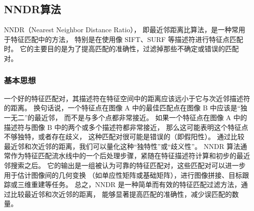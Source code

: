 \subsection{NNDR算法}
NNDR（Nearest Neighbor Distance Ratio），
即最近邻距离比算法，是一种常用于特征匹配中的方法，
特别是在使用像 SIFT、SURF 等描述符进行特征点匹配时。
它的主要目的是为了提高匹配的准确性，过滤掉那些不确定或错误的匹配对。

\subsubsection{基本思想}
一个好的特征匹配对，其描述符在特征空间中的距离应该远小于它与次近邻描述符的距离。
换句话说，一个特征点在图像 A 中的最佳匹配点在图像 B 中应该是“独一无二”的最近邻，
而不是与多个点都非常接近。
如果一个特征点在图像 A 中的描述符与图像 B 中的两个或多个描述符都非常接近，
那么这可能表明这个特征点不够独特，或者存在歧义，
这种匹配对很可能是错误的（即假阳性）。
通过比较最近邻和次近邻的距离，我们可以量化这种“独特性”或“歧义性”。
NNDR 算法通常作为特征匹配流水线中的一个后处理步骤，紧随在特征描述符计算和初步的最近邻搜索之后。
它的输出是一组被认为可靠的特征匹配对，这些匹配对可以进一步用于估计图像间的几何变换
（如单应性矩阵或基础矩阵），进行图像拼接、目标跟踪或三维重建等任务。
总之，NNDR 是一种简单而有效的特征匹配过滤方法，通过比较最近邻和次近邻的距离，
能够显著提高匹配的准确性，减少误匹配的数量。
